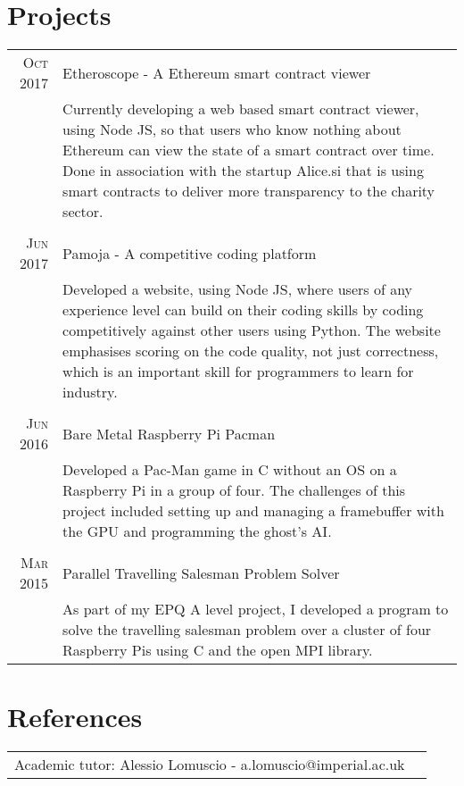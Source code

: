\documentclass[a4paper,10pt]{article} %
\begin{document}
\section{Projects}

\begin{tabular}{r|p{15cm}}
\textsc{Oct 2017} & Etheroscope - A Ethereum smart contract viewer \\
& \footnotesize{Currently developing a web based smart contract viewer, using Node JS, so that users who know nothing about Ethereum can view the state of a smart contract over time. Done in association with the startup Alice.si that is using smart contracts to deliver more transparency to the charity sector.}\\
\multicolumn{2}{c}{} \\

\textsc{Jun 2017} & Pamoja - A competitive coding platform \\
& \footnotesize{Developed a website, using Node JS, where users of any experience level can build on their coding skills by coding competitively against other users using Python. The website emphasises scoring on the code quality, not just correctness, which is an important skill for programmers to learn for industry.} \\
\multicolumn{2}{c}{} \\

\textsc{Jun 2016} & Bare Metal Raspberry Pi Pacman\\
& \footnotesize{Developed a Pac-Man game in C without an OS on a Raspberry Pi in a group of four. The challenges of this project included setting up and managing a framebuffer with the GPU and programming the ghost's AI.} \\
\multicolumn{2}{c}{} \\

\textsc{Mar 2015} & Parallel Travelling Salesman Problem Solver\\
& \footnotesize{As part of my EPQ A level project, I developed a program to solve the travelling salesman problem over a cluster of four Raspberry Pis using C and the open MPI library. }
\end{tabular}


\section{References}

\begin{tabular}{rl}
Academic tutor: Alessio Lomuscio - a.lomuscio@imperial.ac.uk

\end{tabular}
\begin{center}

\end{center}
\end{document}
